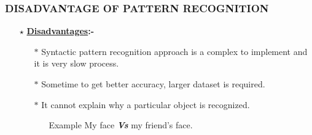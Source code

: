 \documentclass{beamer}
\begin{document}
\begin{frame}
\transsplithorizontalout

\frametitle{DISADVANTAGE OF PATTERN RECOGNITION}
\begin{itemize}
\item[$\star$] {\bf{\underline{Disadvantages}}:-}\\ \pause
\begin{itemize}
\item[$\ast$] Syntactic pattern recognition approach is a complex to implement and it is very slow process.\pause
\item[$\ast$] Sometime to get better accuracy, larger dataset is required. \pause
\item[$\ast$] It cannot explain why a particular object is recognized.\pause
\begin{itemize}
\item[Example] My face {\bf \it Vs} my friend's face.\pause
\end{itemize}
\end{itemize}
\end{itemize}
\end{frame}
\end{document}
